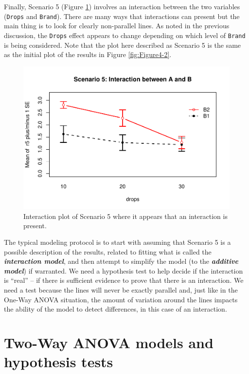 \documentclass[]{book}
\theoremstyle{definition}
\theoremstyle{definition}
\theoremstyle{remark}
\begin{document}
Finally, Scenario 5 (Figure \ref{fig:Figure4-5}) involves an interaction
between the two variables (\texttt{Drops} and \texttt{Brand}). There are
many ways that interactions can present but the main thing is to look
for clearly non-parallel lines. As noted in the previous discussion, the
\texttt{Drops} effect appears to change depending on which level of
\texttt{Brand} is being considered. Note that the plot here described as
Scenario 5 is the same as the initial plot of the results in Figure
\ref{fig:Figure4-2}.




\begin{figure}
\centering
\includegraphics{04-twoWayAnova_files/figure-latex/Figure4-5-1.pdf}
\caption{\label{fig:Figure4-5}Interaction plot of Scenario 5 where it appears that an
interaction is present.}
\end{figure}

The typical modeling protocol is to start with assuming that Scenario 5
is a possible description of the results, related to fitting what is
called the \textbf{\emph{interaction model}}, and then attempt to
simplify the model (to the \textbf{\emph{additive model}}) if warranted.
We need a hypothesis test to help decide if the interaction is ``real''
-- if there is sufficient evidence to prove that there is an
interaction. We need a test because the lines will never be exactly
parallel and, just like in the One-Way ANOVA situation, the amount of
variation around the lines impacts the ability of the model to detect
differences, in this case of an interaction.

\section{Two-Way ANOVA models and hypothesis tests}\label{section4-3}
\end{document}
